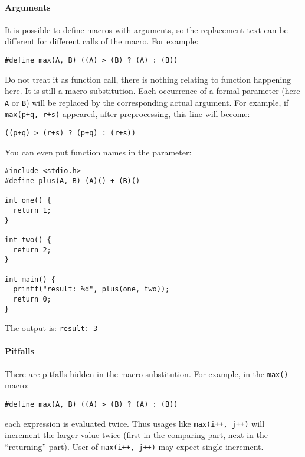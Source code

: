 \documentclass[11pt]{article}
\begin{document}
\paragraph{Arguments}
\label{sec:org84d29fc}
It is possible to define macros with arguments, so the replacement text can be different for different calls of the macro. For example:
\begin{verbatim}
#define max(A, B) ((A) > (B) ? (A) : (B))
\end{verbatim}
Do not treat it as function call, there is nothing relating to function happening here. It is still a macro substitution. Each occurrence of a formal parameter (here \texttt{A} or \texttt{B}) will be replaced by the corresponding actual argument. For example, if \texttt{max(p+q, r+s)} appeared, after preprocessing, this line will become:
\begin{verbatim}
((p+q) > (r+s) ? (p+q) : (r+s))
\end{verbatim}

You can even put function names in the parameter:
\begin{verbatim}
#include <stdio.h>
#define plus(A, B) (A)() + (B)()

int one() {
  return 1;
}

int two() {
  return 2;
}

int main() {
  printf("result: %d", plus(one, two));
  return 0;
}
\end{verbatim}
The output is: \texttt{result: 3}
\paragraph{Pitfalls}
\label{sec:org7581c32}
There are pitfalls hidden in the macro substitution. For example, in the \texttt{max()} macro:
\begin{verbatim}
#define max(A, B) ((A) > (B) ? (A) : (B))
\end{verbatim}
each expression is evaluated twice. Thus usages like \texttt{max(i++, j++)} will increment the larger value twice (first in the comparing part, next in the ``returning'' part). User of \texttt{max(i++, j++)} may expect single increment.
\end{document}

